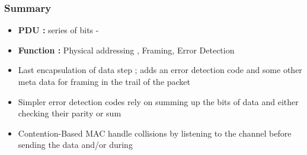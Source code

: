 	\subsubsection{Summary}
		\begin{itemize}
			\item\textbf{PDU : } series of bits - 
			\item\textbf{Function : } Physical addressing , Framing, Error Detection
			\item Last encapsulation of data step ; adds an error detection code and some other meta data for framing in the trail of the packet
			\item Simpler error detection codes rely on summing up the bits of data and either checking their parity or sum
			\item Contention-Based MAC handle collisions by listening to the channel before sending the data and/or during
		\end{itemize}
